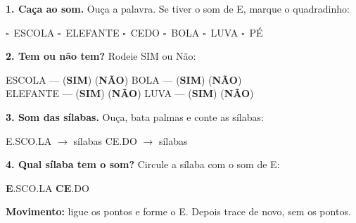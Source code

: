 \begin{somletra}
\textbf{1. Ca\c{c}a ao som.} Ou\c{c}a a palavra. Se tiver o som de E, marque o quadradinho:
\begin{center}
$\square$~ESCOLA \quad $\square$~ELEFANTE \quad $\square$~CEDO \quad $\square$~BOLA \quad $\square$~LUVA \quad $\square$~P\'E
\end{center}

\textbf{2. Tem ou n\~ao{} tem?} Rodeie SIM ou N\~ao:
\begin{center}
ESCOLA --- (\textbf{SIM}) (\textbf{N\~AO}) \quad BOLA --- (\textbf{SIM}) (\textbf{N\~AO}) \\ ELEFANTE --- (\textbf{SIM}) (\textbf{N\~AO}) \quad LUVA --- (\textbf{SIM}) (\textbf{N\~AO})
\end{center}
\end{somletra}

\begin{somsilaba}
\textbf{3. Som das s\'ilabas.} Ou\c{c}a, bata palmas e conte as s\'ilabas:
\begin{center}
E.SCO.LA $\rightarrow$ \underline{\hspace{1cm}} s\'ilabas \quad CE.DO $\rightarrow$ \underline{\hspace{1cm}} s\'ilabas
\end{center}

\textbf{4. Qual s\'ilaba tem o som?} Circule a s\'ilaba com o som de E:
\begin{center}
\textbf{E}.SCO.LA \quad \textbf{CE}.DO
\end{center}
\end{somsilaba}



\begin{motricidade}
\textbf{Movimento:} ligue os pontos e forme o E. Depois trace de novo, sem os pontos.
\begin{center}
\end{center}
\end{motricidade}

